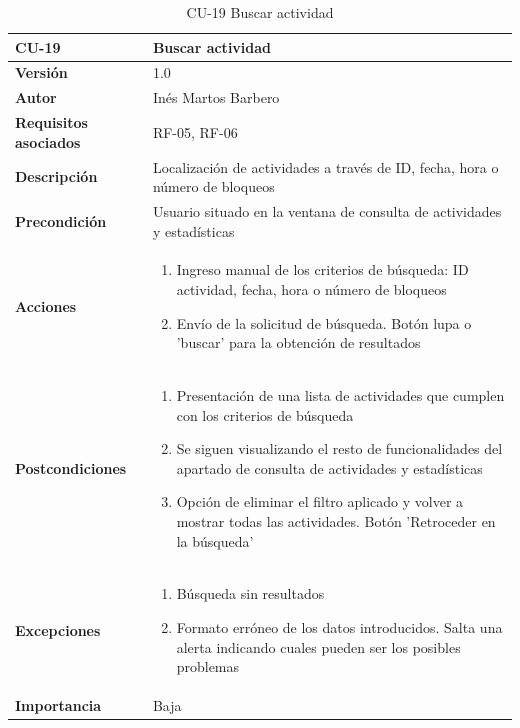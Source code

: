 \begin{table}[p]
	\centering
	\begin{tabularx}{\linewidth}{ p{} p{} }
		\toprule
		\textbf{CU-19}    & \textbf{Buscar actividad}\\
		\toprule
		\textbf{Versión}              & 1.0    \\
		\textbf{Autor}                & Inés Martos Barbero \\
		\textbf{Requisitos asociados} & RF-05, RF-06 \\
		\textbf{Descripción}          & Localización de actividades a través de ID, fecha, hora o número de bloqueos \\
		\textbf{Precondición}         & Usuario situado en la ventana de consulta de actividades y estadísticas \\
		\textbf{Acciones}             &
		\begin{enumerate}
			\def\labelenumi{\arabic{enumi}.}
			\tightlist
			\item Ingreso manual de los criterios de búsqueda: ID actividad, fecha, hora o número de bloqueos
			\item Envío de la solicitud de búsqueda. Botón lupa o 'buscar' para la obtención de resultados
		\end{enumerate}\\
		\textbf{Postcondiciones}        & 
        \begin{enumerate}
			\def\labelenumi{\arabic{enumi}.}
			\tightlist
			\item Presentación de una lista de actividades que cumplen con los criterios de búsqueda
			\item Se siguen visualizando el resto de funcionalidades del apartado de consulta de actividades y estadísticas
            \item Opción de eliminar el filtro aplicado y volver a mostrar todas las actividades. Botón 'Retroceder en la búsqueda'
		\end{enumerate}\\
		\textbf{Excepciones}          & 
        \begin{enumerate}
			\def\labelenumi{\arabic{enumi}.}
			\tightlist
			\item Búsqueda sin resultados
			\item Formato erróneo de los datos introducidos. Salta una alerta indicando cuales pueden ser los posibles problemas
		\end{enumerate}\\
		\textbf{Importancia}          &  Baja \\
		\bottomrule
	\end{tabularx}
	\caption{CU-19 Buscar actividad}
    \label{CU-19}
\end{table}

